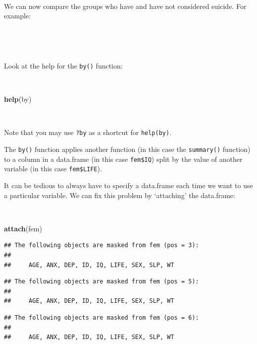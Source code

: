 \documentclass[12pt,a4paper]{book}
\newenvironment{Shaded}{\begin{snugshade}}{\end{snugshade}}
\newcommand{\KeywordTok}[1]{\textcolor[rgb]{0.13,0.29,0.53}{\textbf{#1}}}
\newcommand{\OperatorTok}[1]{\textcolor[rgb]{0.81,0.36,0.00}{\textbf{#1}}}
\newcommand{\NormalTok}[1]{#1}
\theoremstyle{definition}
\theoremstyle{definition}
\theoremstyle{definition}
\theoremstyle{remark}
\begin{document}
~

We can now compare the groups who have and have not considered suicide.
For example:

~

\begin{Shaded}
\end{Shaded}

~

Look at the help for the \texttt{by()} function:

~

\begin{Shaded}
\begin{Highlighting}[]
\KeywordTok{help}\NormalTok{(by)}
\end{Highlighting}
\end{Shaded}

~

Note that you may use \texttt{?by} as a shortcut for \texttt{help(by)}.

The \texttt{by()} function applies another function (in this case the
\texttt{summary()} function) to a column in a data.frame (in this case
\texttt{fem\$IQ}) split by the value of another variable (in this case
\texttt{fem\$LIFE}).

It can be tedious to always have to specify a data.frame each time we
want to use a particular variable. We can fix this problem by
`attaching' the data.frame:

~

\begin{Shaded}
\begin{Highlighting}[]
\KeywordTok{attach}\NormalTok{(fem)}
\end{Highlighting}
\end{Shaded}

\begin{verbatim}
## The following objects are masked from fem (pos = 3):
## 
##     AGE, ANX, DEP, ID, IQ, LIFE, SEX, SLP, WT
\end{verbatim}

\begin{verbatim}
## The following objects are masked from fem (pos = 5):
## 
##     AGE, ANX, DEP, ID, IQ, LIFE, SEX, SLP, WT
\end{verbatim}

\begin{verbatim}
## The following objects are masked from fem (pos = 6):
## 
##     AGE, ANX, DEP, ID, IQ, LIFE, SEX, SLP, WT
\end{verbatim}
\end{document}
